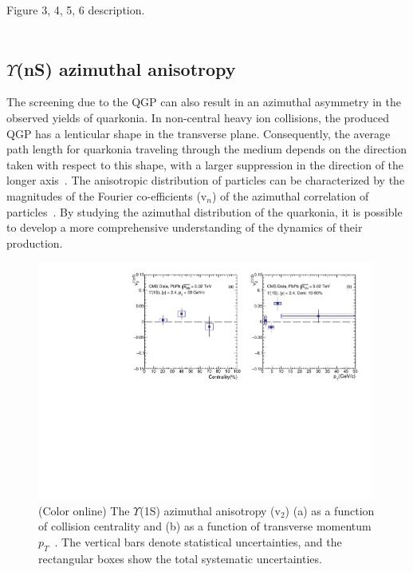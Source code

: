 Figure 3, 4, 5, 6 description.
\ \\
\ \\





\subsection{$\Upsilon$(nS) azimuthal anisotropy}

The screening due to the QGP can also result in an azimuthal asymmetry in the observed yields of quarkonia. In non-central
heavy ion collisions, the produced QGP has a lenticular shape in the transverse plane. Consequently, the average path length
for quarkonia traveling through the medium depends on the direction taken with respect to this shape, with a larger suppression
in the direction of the longer axis~\cite{He:2015hfa}. The anisotropic distribution of particles can be characterized by the magnitudes
of the Fourier co-efficients (v$_{n}$) of the azimuthal correlation of particles~\cite{Voloshin:1994mz}. By studying the
azimuthal distribution of the quarkonia, it is possible to develop a more comprehensive understanding of the dynamics of their
production.

\begin{figure}
\includegraphics[width=0.99\textwidth]{Figures/ExpOverview/Fig_CMS_Y1S_5TeV_V2.pdf}
\caption{(Color online) The $\Upsilon$(1S) azimuthal anisotropy (v$_{2}$) (a) as a function of collision centrality and 
  (b) as a function of transverse momentum $p_{T}$~\cite{CMS:2020efs}. The vertical bars denote statistical uncertainties,
  and the rectangular boxes show the total systematic uncertainties.
}
\label{fig:Upsilon1SV2CMS}
\end{figure}



